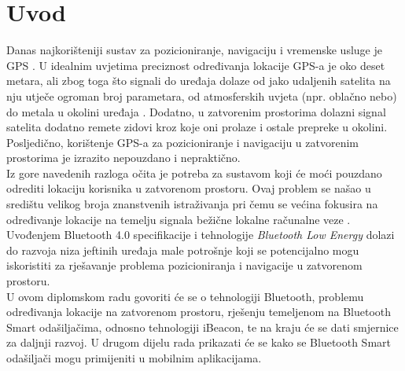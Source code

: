 \chapter{Uvod}

Danas najkorišteniji sustav za pozicioniranje, navigaciju i vremenske usluge je GPS . %
U idealnim uvjetima preciznost određivanja lokacije GPS-a je oko deset metara, ali zbog toga što signali do uređaja dolaze od jako udaljenih satelita na nju utječe ogroman broj parametara, od atmosferskih uvjeta (npr. oblačno nebo) do metala u okolini uređaja \citep{schneider2013}. 
Dodatno, u zatvorenim prostorima dolazni signal satelita dodatno remete zidovi kroz koje oni prolaze i ostale prepreke u okolini.
Posljedično, korištenje GPS-a za pozicioniranje i navigaciju u zatvorenim prostorima je izrazito nepouzdano i nepraktično.
\\

Iz gore navedenih razloga očita je potreba za sustavom koji će moći pouzdano odrediti lokaciju korisnika u zatvorenom prostoru. 
Ovaj problem se našao u središtu velikog broja znanstvenih istraživanja pri čemu se većina fokusira na određivanje lokacije na temelju signala bežične lokalne računalne veze . %
Uvođenjem Bluetooth 4.0 specifikacije i tehnologije \textit{Bluetooth Low Energy} dolazi do razvoja niza jeftinih uređaja male potrošnje koji se potencijalno mogu iskoristiti za rješavanje problema pozicioniranja i navigacije u zatvorenom prostoru.
\\

U ovom diplomskom radu govoriti će se o tehnologiji Bluetooth, problemu određivanja lokacije na zatvorenom prostoru, rješenju temeljenom na Bluetooth Smart odašiljačima, odnosno tehnologiji iBeacon, te na kraju će se dati smjernice za daljnji razvoj. 
U drugom dijelu rada prikazati će se kako se Bluetooth Smart odašiljači mogu primijeniti u mobilnim aplikacijama.